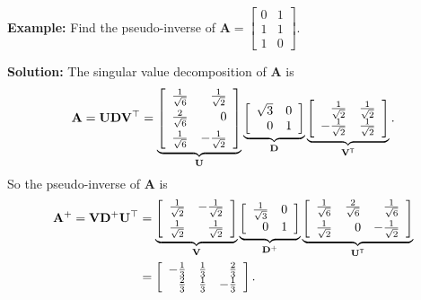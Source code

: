 {\bf Example:} Find the pseudo-inverse of  $\mathbf{A}=\left[\begin{array}{cc}0&1\\1&1\\1&0\end{array}\right].$

{\bf Solution:} The singular value decomposition of $\mathbf A$ is 
\[
\mathbf{A}= \mathbf{UDV^\top} =
\underbrace{\left[\begin{array}{rr}
\frac{1}{\sqrt{6}}\vspace*{1mm}&\frac{1}{\sqrt{2}}\\\frac{2}{\sqrt{6}}\vspace*{1mm}&0\\ \frac{1}{\sqrt{6}}&-\frac{1}{\sqrt{2}} 
\end{array}\right]}_{\mathbf{U}}
\underbrace{\left[\begin{array}{rr}
\sqrt{3}&0\\0&1
\end{array}\right]}_{\mathbf{D}}
\underbrace{\left[\begin{array}{rr}
\frac{1}{\sqrt{2}}&\frac{1}{\sqrt{2}}\\-\frac{1}{\sqrt{2}}&\frac{1}{\sqrt{2}}
\end{array}\right]}_{\mathbf{V}^\mathsf{T}}.
\]
So the pseudo-inverse of $\mathbf A$ is 
\begin{align*}
\mathbf{A}^{+}= \mathbf{VD^+U^\top} & = 
\underbrace{\left[\begin{array}{rr}
\frac{1}{\sqrt{2}}\vspace*{1mm}&-\frac{1}{\sqrt{2}}\\ \frac{1}{\sqrt{2}}&\frac{1}{\sqrt{2}}
\end{array}\right]}_{\mathbf{V}}
\underbrace{\left[\begin{array}{rr}
\frac{1}{\sqrt{3}}&0\\0&1
\end{array}\right]}_{\mathbf{D}^{+}}
\underbrace{\left[\begin{array}{rrr}
\frac{1}{\sqrt{6}}\vspace*{1mm}&\frac{2}{\sqrt{6}}& \frac{1}{\sqrt{6}}\\
\frac{1}{\sqrt{2}} &0 &-\frac{1}{\sqrt{2}} 
\end{array}\right]}_{\mathbf{U}^\mathsf{T}} \\
&= \left[\begin{array}{rrr}
-\frac{1}{3}&\frac{1}{3}& \frac{2}{3}\\
\frac{2}{3} &\frac{1}{3} &-\frac{1}{3} 
\end{array}\right].
\end{align*}

